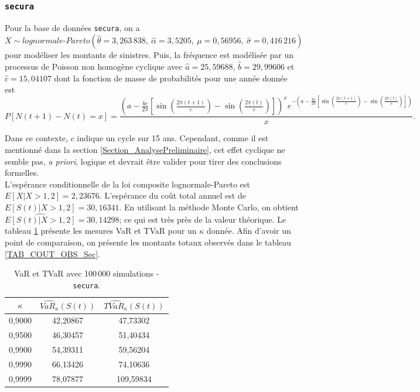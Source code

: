		\subsubsection{\texttt{secura}}	
		Pour la base de données \texttt{secura}, on a $X \sim lognormale\text{-}Pareto(\hat{\theta}=3,263\,838,\:\hat{\alpha}=3,5205,\:\mu = 0,56956,\:\hat{\sigma}=0,416\,216)$ pour modéliser les montants de sinistres. Puis, la fréquence est modélisée par un processus de Poisson non homogène cyclique avec $\hat{a}=25,59688$, $\hat{b}=29,99606$ et $\hat{c}=15,04107$ dont la fonction de masse de probabilités pour une année donnée est 
		$$
		P[N(t+1)-N(t) =x ] = \frac{ \left(  a-\frac{bc}{2\pi}\left[\sin\left(\frac{2\pi(t+1)}{c}\right)-\sin\left(\frac{2\pi(t)}{c}\right)\right]  \right)^{x} e^{-\left(a-\frac{bc}{2\pi}\left[\sin\left(\frac{2\pi(t+1)}{c}\right)-\sin\left(\frac{2\pi(t)}{c}\right)\right] \right)} }{x}.
		$$
		
		Dans ce contexte, $c$ indique un cycle sur 15 ans. Cependant, comme il est mentionné dans la section \ref{Section_AnalysePreliminaire}, cet effet cyclique ne semble pas, \textit{a priori}, logique et devrait être valider pour tirer des conclusions formelles. \\
		
		L'espérance conditionnelle de la loi composite lognormale-Pareto est $E[X|X>1,2] =2,23676$. L'espérance du coût total annuel est de $E[S(t)|X>1,2]=30,16341$. En utilisant la méthode Monte Carlo, on obtient $\widehat{E[S(t)|X>1,2]}=30,14298$; ce qui est très près de la valeur théorique. Le tableau \ref{TAB_TVAR_Sec} présente les mesures VaR et TVaR pour un $\kappa$ donnée. Afin d'avoir un point de comparaison, on présente les montants totaux observés dans le tableau \ref{TAB_COUT_OBS_Sec}.
		
		\begin{table}[H]
			\begin{center}
				\begin{tabular}{|c|c|c|}
					\hline
					$\kappa$ & $\widehat{VaR_{\kappa}}(S(t))$ & $\widehat{TVaR_{\kappa}}(S(t))$ \\ \hline
					0,9000   &          42,20867           &           47,73302           \\
					0,9500   &          46,30457           &           51,40434           \\
					0,9900   &          54,39311           &           59,56204           \\
					0,9990   &          66,13426           &           74,10636           \\
					0,9999   &          78,07877           &          109,59834           \\ \hline
				\end{tabular}
				\renewcommand{\tablename}{Tableau}
				\caption{VaR et TVaR avec 100\,000 simulations - \texttt{secura}.}\label{TAB_TVAR_Sec}
			\end{center}
		\end{table}
	
